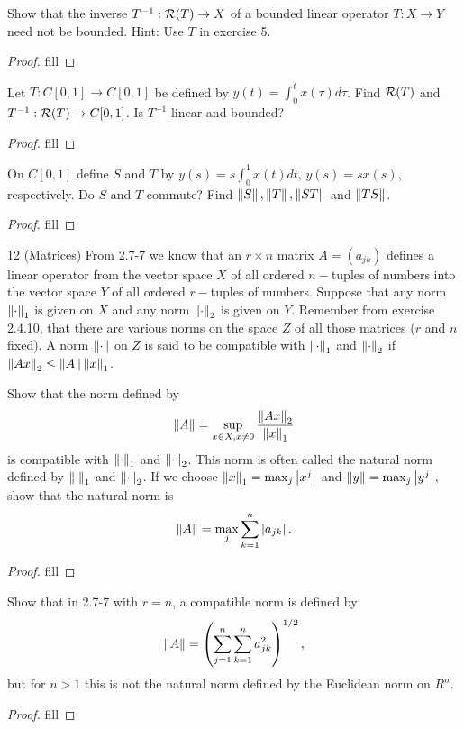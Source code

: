 \begin{exercise}{8}
Show that the inverse $T^{-1}:\mathcal{R}(T)\to X$ of a bounded linear operator $T:X\to Y$ need not be bounded. Hint: Use $T$ in exercise 5.
\end{exercise}
\begin{proof}
fill
\end{proof}

\begin{exercise}{9}
Let $T:C[0,1]\to C[0,1]$ be defined by $y(t)=\int_0^t x(\tau)d\tau$. Find $\mathcal{R}(T)$ and $T^{-1}:\mathcal{R}(T)\to C[0,1]$. Is $T^{-1}$ linear and bounded?
\end{exercise}
\begin{proof}
fill
\end{proof}

\begin{exercise}{10}
On $C[0,1]$ define $S$ and $T$ by $y(s)=s\int_0^1x(t)dt$, $y(s)=sx(s)$, respectively. Do $S$ and $T$ commute? Find $\left\lVert S\right\rVert, \left\lVert T\right\rVert, \left\lVert ST\right\rVert$ and $\left\lVert TS\right\rVert$.
\end{exercise}
\begin{proof}
fill
\end{proof}

\begin{exercise}{12 (Matrices)}
From 2.7-7 we know that an $r\times n$ matrix $A=(a_{jk})$ defines a linear operator from the vector space $X$ of all ordered $n-$tuples of numbers into the vector space $Y$ of all ordered $r-$tuples of numbers. Suppose that any norm $\left\lVert \cdot\right\rVert_1$ is given on $X$ and any norm $\left\lVert \cdot\right\rVert_2$ is given on $Y$. Remember from exercise 2.4.10, that there are various norms on the space $Z$ of all those matrices ($r$ and $n$ fixed). A norm $\left\lVert \cdot\right\rVert$ on $Z$ is said to be compatible with $\left\lVert \cdot\right\rVert_1$ and $\left\lVert \cdot\right\rVert_2$ if $\left\lVert Ax\right\rVert_2 \leq\left\lVert A\right\rVert\left\lVert x\right\rVert_1$.

Show that the norm defined by
\[
\left\lVert A\right\rVert = \sup_{x\in X, x\neq 0}\frac{\left\lVert Ax\right\rVert_2}{\left\lVert x\right\rVert_1}
\]
is compatible with $\left\lVert \cdot\right\rVert_1$ and $\left\lVert \cdot\right\rVert_2$. This norm is often called the natural norm defined by $\left\lVert \cdot\right\rVert_1$ and $\left\lVert \cdot\right\rVert_2$. If we choose $\left\lVert x\right\rVert_1=\max_j\left\lvert x^j\right\rvert$ and $\left\lVert y\right\rVert=\max_j\left\lvert y^j\right\rvert$, show that the natural norm is
\[
\left\lVert A\right\rVert=\max_j\sum^n_{k=1}\left\lvert a_{jk}\right\rvert.
\]
\end{exercise}
\begin{proof}
fill
\end{proof}

\begin{exercise}{13}
Show that in 2.7-7 with $r=n$, a compatible norm is defined by 
\[
\left\lVert A\right\rVert = \left( \sum^n_{j=1}\sum^n_{k=1}a^2_{jk}\right)^{1/2},
\]
but for $n>1$ this is not the natural norm defined by the Euclidean norm on $R^n$.
\end{exercise}
\begin{proof}
fill
\end{proof}


